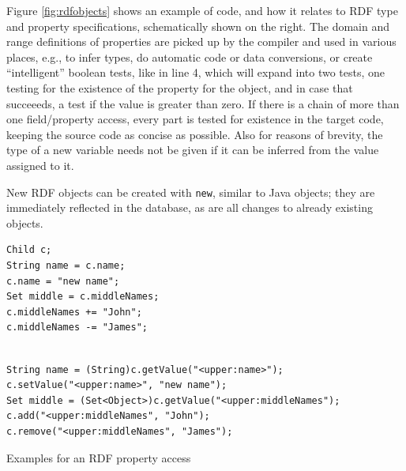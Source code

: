 Figure \ref{fig:rdfobjects} shows an example of \vonda code, and how it relates
to RDF type and property specifications, schematically shown on the right.  The
domain and range definitions of properties are picked up by the compiler and
used in various places, e.g., to infer types, do automatic code or data
conversions, or create ``intelligent'' boolean tests, like in line 4, which
will expand into two tests, one testing for the existence of the property for
the object, and in case that succeeeds, a test if the value is greater than
zero. If there is a chain of more than one field/property access, every part is
tested for existence in the target code, keeping the source code as concise as
possible. Also for reasons of brevity, the type of a new variable needs not be
given if it can be inferred from the value assigned to it.

New RDF objects can be created with \texttt{new}, similar to Java objects; they
are immediately reflected in the database, as are all changes to already
existing objects.


\begin{table}[htbp]
  \centering
\begin{small}
\begin{minipage}[t]{0.35\textwidth}
\begin{verbatim}
Child c;
String name = c.name;
c.name = "new name";
Set middle = c.middleNames;
c.middleNames += "John";
c.middleNames -= "James";
\end{verbatim}
\end{minipage}
\begin{minipage}[t]{0.6\textwidth}
\begin{verbatim}

String name = (String)c.getValue("<upper:name>");
c.setValue("<upper:name>", "new name");
Set middle = (Set<Object>)c.getValue("<upper:middleNames");
c.add("<upper:middleNames", "John");
c.remove("<upper:middleNames", "James");
\end{verbatim}
\end{minipage}
\end{small}
  \caption{Examples for an RDF property access}
  \label{tab:property-access}
\end{table}

